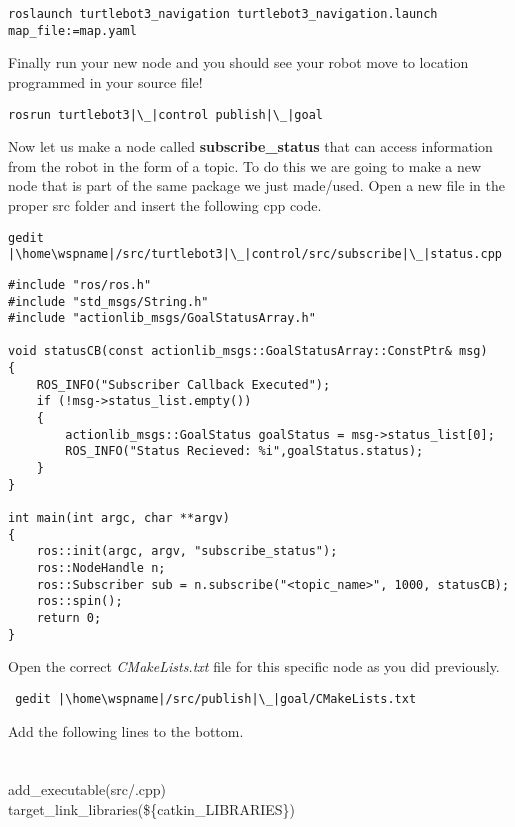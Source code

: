 \documentclass[12pt]{article}
\begin{document}
\begin{description}[labelindent=1cm]
\begin{verbatim}
roslaunch turtlebot3_navigation turtlebot3_navigation.launch map_file:=map.yaml
\end{verbatim}

\item Finally run your new node and you should see your robot move to location programmed in your source file!

\begin{verbatim}
rosrun turtlebot3|\_|control publish|\_|goal
\end{verbatim}

     \newpage
\item Now let us make a node called {\bf subscribe\_status} that can access information from the robot in the form of a topic. To do this we are going to make a new node that is part of the same package we just made/used. Open a new file in the proper src folder and insert the following cpp code.
\begin{verbatim}
gedit |\home\wspname|/src/turtlebot3|\_|control/src/subscribe|\_|status.cpp 
\end{verbatim}   

         \begin{lstlisting}
#include "ros/ros.h"
#include "std_msgs/String.h"
#include "actionlib_msgs/GoalStatusArray.h"

void statusCB(const actionlib_msgs::GoalStatusArray::ConstPtr& msg)
{
    ROS_INFO("Subscriber Callback Executed");
    if (!msg->status_list.empty())
    {
        actionlib_msgs::GoalStatus goalStatus = msg->status_list[0];
        ROS_INFO("Status Recieved: %i",goalStatus.status);  
    }
}

int main(int argc, char **argv)
{
    ros::init(argc, argv, "subscribe_status");
    ros::NodeHandle n;
    ros::Subscriber sub = n.subscribe("<topic_name>", 1000, statusCB);
    ros::spin();
    return 0;
}
    \end{lstlisting}
    
    \item Open the correct {\it CMakeLists.txt} file for this specific node as you did previously.

\begin{verbatim}
 gedit |\home\wspname|/src/publish|\_|goal/CMakeLists.txt 
\end{verbatim}

Add the following lines to the bottom.\\
 \underline{\hspace{155mm}}\\\\
 {\selectfont add\_executable(\nodname\hspace{3mm}src/\nodname.cpp) } \\
{\selectfont target\_link\_libraries(\nodname \hspace{3mm}\$\{catkin\_LIBRARIES\}) } \\
\underline{\hspace{155mm}}\\\\
 

\end{description}
\end{document}
